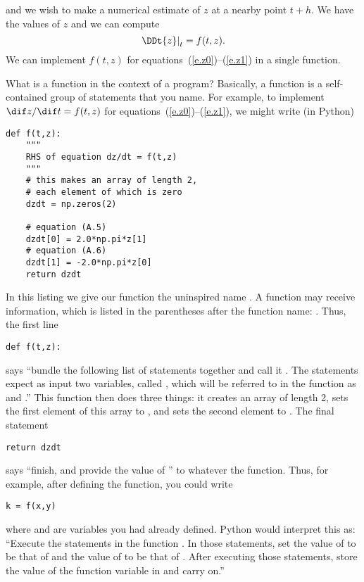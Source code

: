  and we wish to make a numerical estimate of $z$ at a nearby point $t+h$. We have the values of $z$ and we can compute
\[
	\left.\DDt{z}\right|_{t} = f(t,z).
\]
We can implement $f(t,z)$ for equations~(\ref{e.z0})--(\ref{e.z1}) in a single function.

\begin{sidebar}[Functions]
What is a function in the context of a program? Basically, a function is a self-contained group of statements that you name. For example, to implement $\dif z/\dif t = f(t,z)$ for equations~(\ref{e.z0})--(\ref{e.z1}), we might write (in Python)
\begin{Verbatim}[numbers=none]
def f(t,z):
    """
    RHS of equation dz/dt = f(t,z)
    """
    # this makes an array of length 2,
    # each element of which is zero
    dzdt = np.zeros(2)

    # equation (A.5)
    dzdt[0] = 2.0*np.pi*z[1]
    # equation (A.6)
    dzdt[1] = -2.0*np.pi*z[0]
    return dzdt
\end{Verbatim}
In this listing we give our function the uninspired name . A function may receive information, which is listed in the parentheses after the function name: . Thus, the first line
\begin{Verbatim}[numbers=none]
def f(t,z):
\end{Verbatim}
says ``bundle the following list of statements together and call it . The statements expect as input two variables, called , which will be referred to in the function as  and .''
This function then does three things: it creates an array  of length 2, sets the first element of this array to , and sets the second element to . The final statement
\begin{Verbatim}[numbers=none]
    return dzdt
\end{Verbatim}
says ``finish, and provide the value of '' to whatever  the function. Thus, for example, after defining the function, you could write
\begin{Verbatim}[numbers=none]
k = f(x,y)
\end{Verbatim}
where  and  are variables you had already defined.
Python would interpret this as: ``Execute the statements in the function . In those statements, set the value of  to be that of  and the value of  to be that of . After executing those statements, store the value of the function variable   in  and carry on.''
\end{sidebar}

